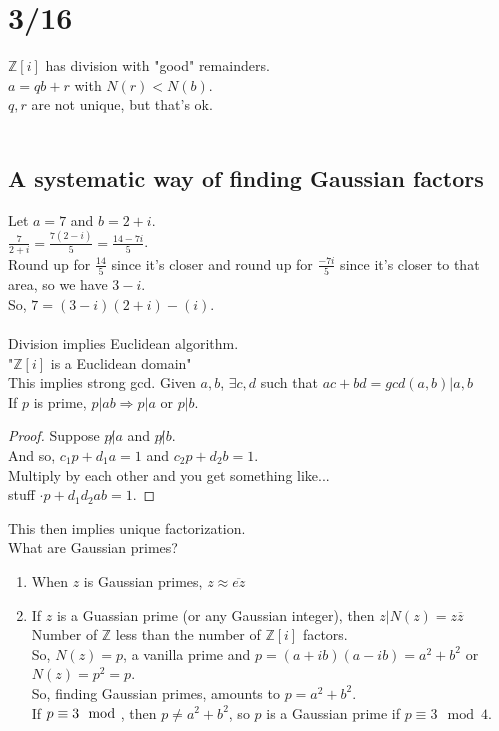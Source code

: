 \section*{3/16}
  $\mathbb{Z}[i]$ has division with "good" remainders.\\
  $a = qb + r$ with $N(r) < N(b)$.\\
  $q, r$ are not unique, but that's ok.\\\\
  \subsection*{A systematic way of finding Gaussian factors}
    Let $a = 7$ and $b = 2+i$.\\
    $\frac{7}{2 + i} = \frac{7(2-i)}{5} = \frac{14 - 7i}{5}$.\\
    Round up for $\frac{14}{5}$ since it's closer and round up
    for $\frac{-7i}{5}$ since it's closer to that area, so we have
    $3 - i$.\\
    So, $7 = (3-i)(2+i) - (i)$.\\\\
    Division implies Euclidean algorithm.\\
    "$\mathbb{Z}[i]$ is a Euclidean domain"\\
    This implies strong gcd. Given $a,b$, $\exists c,d$ such that
    $ac + bd = gcd(a,b) | a,b$\\
    If $p$ is prime, $p | ab \Rightarrow p|a$ or $p|b$.\\
    \begin{proof}
      Suppose $p\not| a$ and $p \not| b$.\\
      And so, $c_1p + d_1a = 1$ and $c_2p + d_2b = 1$.\\
      Multiply by each other and you get something like...\\
      stuff $\cdot p + d_1d_2ab = 1$.
    \end{proof}
    This then implies unique factorization.\\
    What are Gaussian primes?\\
    \begin{enumerate}
      \item When $z$ is Gaussian primes, $z \approx \overline{ez}$\\
      \item If $z$ is a Guassian prime (or any Gaussian integer), then
        $z | N(z) = z \overline{z}$\\
        Number of $\mathbb{Z}$ less than the number of $\mathbb{Z}[i]$
        factors.\\
        So, $N(z) = p$, a vanilla prime and $p = (a + ib)(a - ib) = a^2 + b^2$
        or $N(z) = p^2 = p$.\\
        So, finding Gaussian primes, amounts to $p = a^2 + b^2$.\\
        If $p \equiv 3 \mod $, then $p \not= a^2 + b^2$, so $p$ is a Gaussian
        prime if $p \equiv 3 \mod 4$.
    \end{enumerate}

